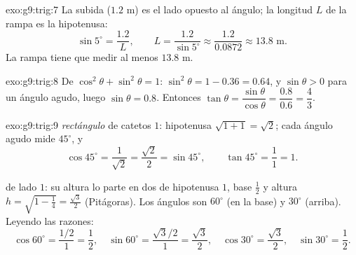 \begin{solution}{exo:g9:trig:7}
La subida ($1.2$ m) es el lado opuesto al ángulo; la longitud $L$ de la rampa es la
hipotenusa:
\[
\sin 5^\circ = \frac{1.2}{L},
\qquad
L = \frac{1.2}{\sin 5^\circ} \approx \frac{1.2}{0.0872} \approx 13.8
\text{ m}.
\]
La rampa tiene que medir al menos $13.8$ m.
\end{solution}

\begin{solution}{exo:g9:trig:8}
De $\cos^2\theta + \sin^2\theta = 1$:
$\sin^2\theta = 1 - 0.36 = 0.64$, y $\sin\theta > 0$ para un ángulo
agudo, luego $\sin\theta = 0.8$. Entonces
$\tan\theta = \dfrac{\sin\theta}{\cos\theta} = \dfrac{0.8}{0.6} =
\dfrac43$.
\end{solution}

\begin{solution}{exo:g9:trig:9}
\emph{ rectángulo} de catetos $1$: hipotenusa
$\sqrt{1 + 1} = \sqrt2$; cada ángulo agudo mide $45^\circ$, y
\[
\cos 45^\circ = \frac{1}{\sqrt2} = \frac{\sqrt2}{2} = \sin 45^\circ,
\qquad
\tan 45^\circ = \frac11 = 1 .
\]

\emph{} de lado $1$: su altura lo parte en dos
 de hipotenusa $1$, base $\frac12$ y altura
$h = \sqrt{1 - \frac14} = \frac{\sqrt3}{2}$ (Pitágoras). Los ángulos son
$60^\circ$ (en la base) y $30^\circ$ (arriba). Leyendo las
razones:
\[
\cos 60^\circ = \frac{1/2}{1} = \frac12, \quad
\sin 60^\circ = \frac{\sqrt3/2}{1} = \frac{\sqrt3}{2}, \quad
\cos 30^\circ = \frac{\sqrt3}{2}, \quad
\sin 30^\circ = \frac12 .
\]
\end{solution}

